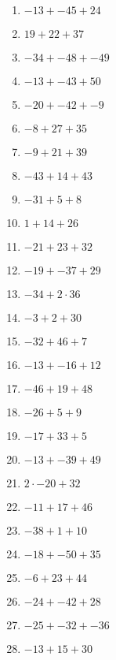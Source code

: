 \documentclass[9pt,dvipdfmx,a4paper]{article}
\begin{document}
\begin{multicols}{2}
\begin{enumerate}
\item
$ -13 + -45 + 24$

\item
$ 19 + 22 + 37$

\item
$ -34 + -48 + -49$

\item
$ -13 + -43 + 50$

\item
$ -20 + -42 + -9$

\item
$ -8 + 27 + 35$

\item
$ -9 + 21 + 39$

\item
$ -43 + 14 + 43$

\item
$ -31 + 5 + 8$

\item
$ 1 + 14 + 26$

\item
$ -21 + 23 + 32$

\item
$ -19 + -37 + 29$

\item
$ -34 + 2 \cdot 36$

\item
$ -3 + 2 + 30$

\item
$ -32 + 46 + 7$

\item
$ -13 + -16 + 12$

\item
$ -46 + 19 + 48$

\item
$ -26 + 5 + 9$

\item
$ -17 + 33 + 5$

\item
$ -13 + -39 + 49$

\item
$ 2 \cdot -20 + 32$

\item
$ -11 + 17 + 46$

\item
$ -38 + 1 + 10$

\item
$ -18 + -50 + 35$

\item
$ -6 + 23 + 44$

\item
$ -24 + -42 + 28$

\item
$ -25 + -32 + -36$

\item
$ -13 + 15 + 30$


\end{enumerate}
\end{multicols}
\end{document}

